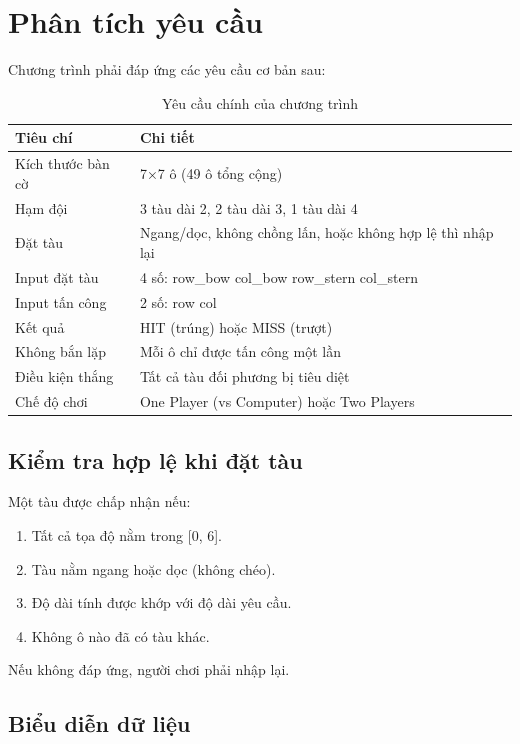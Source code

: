 \section{Phân tích yêu cầu}

Chương trình phải đáp ứng các yêu cầu cơ bản sau:

\begin{table}[H]
\centering
\small
\begin{tabular}{|l|p{10cm}|}
\hline
\textbf{Tiêu chí} & \textbf{Chi tiết} \\
\hline
Kích thước bàn cờ & 7×7 ô (49 ô tổng cộng) \\
\hline
Hạm đội & 3 tàu dài 2, 2 tàu dài 3, 1 tàu dài 4 \\
\hline
Đặt tàu & Ngang/dọc, không chồng lấn, hoặc không hợp lệ thì nhập lại \\
\hline
Input đặt tàu & 4 số: row\_bow col\_bow row\_stern col\_stern \\
\hline
Input tấn công & 2 số: row col \\
\hline
Kết quả & HIT (trúng) hoặc MISS (trượt) \\
\hline
Không bắn lặp & Mỗi ô chỉ được tấn công một lần \\
\hline
Điều kiện thắng & Tất cả tàu đối phương bị tiêu diệt \\
\hline
Chế độ chơi & One Player (vs Computer) hoặc Two Players \\
\hline
\end{tabular}
\caption{Yêu cầu chính của chương trình}
\end{table}

\subsection{Kiểm tra hợp lệ khi đặt tàu}

Một tàu được chấp nhận nếu:
\begin{enumerate}
    \item Tất cả tọa độ nằm trong [0, 6].
    \item Tàu nằm ngang hoặc dọc (không chéo).
    \item Độ dài tính được khớp với độ dài yêu cầu.
    \item Không ô nào đã có tàu khác.
\end{enumerate}

Nếu không đáp ứng, người chơi phải nhập lại.

\subsection{Biểu diễn dữ liệu}

